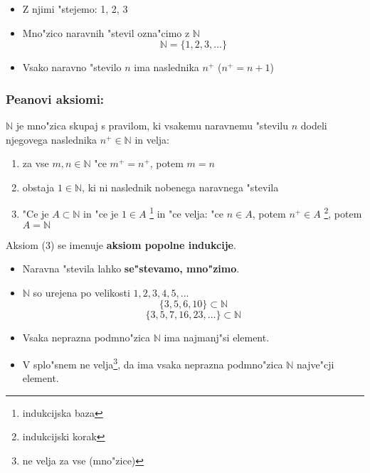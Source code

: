 \begin{itemize}
	\item Z njimi "stejemo: 1, 2, 3
	\item Mno"zico naravnih "stevil ozna"cimo z \(\mathbb{N} \)\\
		\[\mathbb{N} = \{1, 2, 3, ...\} \]
	\item Vsako naravno "stevilo \(n\) ima naslednika \(n^+\) (\(n^+ = n + 1\))
\end{itemize}

\subsubsection*{Peanovi aksiomi:}
\(\mathbb{N} \) je mno"zica skupaj s pravilom, ki vsakemu naravnemu "stevilu \(n\) dodeli njegovega naslednika \(n^+ \in \mathbb{N} \) in velja:
\begin{enumerate}
	\item za vse \(m, n \in \mathbb{N} \) "ce \(m^+ = n^+\), potem \(m = n\)
	\item obstaja \(1 \in \mathbb{N} \), ki ni naslednik nobenega naravnega "stevila
	\item  "Ce je \(A \subset \mathbb{N} \) in "ce je \(1 \in A \) \footnote{indukcijska baza} in "ce velja: "ce \(n \in A \), potem \(n^+ \in A \) \footnote{indukcijski korak}, potem \(A = \mathbb{N}\)
\end{enumerate}
Aksiom (3) se imenuje \textbf{aksiom popolne indukcije}.

\begin{itemize}
	\item Naravna "stevila lahko \textbf{se"stevamo, mno"zimo}.
	\item \(\mathbb{N} \) so urejena po velikosti \(1, 2, 3, 4, 5, ...\)
		\[\{3, 5, 6, 10\} \subset \mathbb{N}\]
		\[\{3, 5, 7, 16, 23, ... \} \subset \mathbb{N} \]
	\item Vsaka neprazna podmno"zica \(\mathbb{N} \) ima najmanj"si element.
	\item V splo"snem ne velja\footnote{ne velja za vse (mno"zice)}, da ima vsaka neprazna podmno"zica \(\mathbb{N} \) najve"cji element.
\end{itemize}
